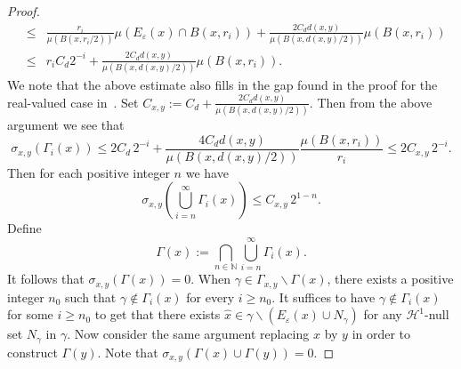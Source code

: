 \documentclass[11pt, letterpaper]{amsart} %
\newcommand*{\N}{{\mathbb N}}
\numberwithin{equation}{section}
\theoremstyle{plain}
\theoremstyle{definition}
\begin{document}
{\begin{proof}
\begin{eqnarray*}
&\leq &\frac{r_i}{\mu (B(x,r_i/2))}\mu (E_\varepsilon (x)\cap B(x,r_i))+\frac{2C_dd(x,y)}{\mu (B(x,d(x,y)/2))}\mu (B(x,r_i))\\
&\leq& r_iC_d2^{-i}+\frac{2C_dd(x,y)}{\mu (B(x,d(x,y)/2))}\mu (B(x,r_i)). 
\end{eqnarray*}
We note that the above estimate also fills in the gap found in the proof for the real-valued case 
in~\cite[page~243]{DEKS}.
Set $C_{x,y}:=C_d+\tfrac{2C_dd(x,y)}{\mu (B(x,d(x,y)/2))}$.
Then from the above argument we see that 
\[
\sigma_{x,y}(\Gamma_i (x))\leq 2C_d\,2^{-i}+\frac{4C_dd(x,y)}{\mu (B(x,d(x,y)/2))}\frac{\mu( B(x,r_i))}{r_i}\leq 2C_{x,y}\,2^{-i}. 
\]
Then for each positive integer $n$ we have
\[
\sigma_{x,y}\left( \bigcup_{i=n}^\infty \Gamma_i(x)\right)\le C_{x,y}\, 2^{1-n}.
\]
Define
\[
\Gamma (x):=\bigcap_{n\in\N}\bigcup_{i=n}^\infty \Gamma_i(x).
\]
It follows that $\sigma_{x,y}(\Gamma (x))=0$. 
When
$\gamma\in\Gamma_{x,y}\backslash \Gamma (x)$, there exists a positive integer $n_0$ 
such that $\gamma\notin \Gamma_i(x)$ for every $i\geq n_0$. 
It suffices to have $\gamma\notin\Gamma_i(x)$ for some $i\ge n_0$ to get that there exists 
$\hat{x}\in \gamma\backslash (E_\varepsilon (x)\cup N_\gamma )$ for any $\mathcal{H}^1$-null set $N_\gamma$ in $\gamma$. 
Now consider the same argument replacing $x$ by $y$ in order to construct $\Gamma (y)$. Note that
$\sigma_{x,y}(\Gamma(x)\cup\Gamma(y))=0$.


\end{proof}}
\end{document}

